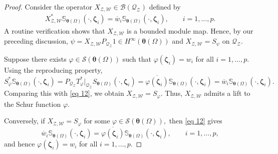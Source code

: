 \documentclass[10pt,a4paper]{amsart}
\newcommand{\beq}{\begin{eqnarray}}
\newcommand{\eeq}{\end{eqnarray}}
\begin{document}
\begin{proof}
    Consider the operator $X_{\mathcal{Z,W}}\in \mathcal{B}(\mathcal{Q}_{\mathcal{Z}})$ defined by \beq \label{eq 12} X_{\mathcal{Z,W}}^* \mathbb S_{\boldsymbol \theta(\Omega)}(\cdot, \boldsymbol \zeta_i)=\overline{w}_i \mathbb S_{\boldsymbol \theta(\Omega)}(\cdot, \boldsymbol \zeta_i),\qquad i=1,\ldots,p.\eeq 
    A routine verification shows that $X_{\mathcal{Z},\mathcal{W}}$ is a bounded module map. Hence, by our preceding discussion, $\psi=X_{\mathcal{Z,W}}P_{\mathcal{Q}_{\mathcal{Z}}}1\in H^\infty(\boldsymbol \theta(\Omega))$ and $X_{\mathcal{Z,W}}=S_{\psi}$ on $\mathcal{Q}_{\mathcal{Z}}.$

    Suppose there exists $\varphi\in \mathcal{S}(\boldsymbol \theta(\Omega))$ such that $\varphi(\boldsymbol{\zeta}_i) = w_i$ for all $i = 1, \ldots, p$. Using the reproducing property,
    $$S_{\varphi}^* \mathbb S_{\boldsymbol \theta(\Omega)}(\cdot, \boldsymbol \zeta_i)=P_{\mathcal{Q}_{\mathcal{Z}}} T_{\varphi}^*|_{\mathcal{Q}_{\mathcal{Z}}} S_{\boldsymbol \theta(\Omega)}(\cdot, \boldsymbol \zeta_i) = \overline{\varphi(\boldsymbol \zeta_i)}\mathbb S_{\boldsymbol \theta(\Omega)}(\cdot, \boldsymbol \zeta_i)=\overline{w}_i \mathbb S_{\boldsymbol \theta(\Omega)}(\cdot, \boldsymbol \zeta_i).$$ 
    Comparing this with \eqref{eq 12}, we obtain $X_{\mathcal{Z,W}}=S_{\varphi}.$ Thus, $X_{\mathcal{Z},\mathcal{W}}$ admits a lift to the Schur function $\varphi.$
    
    Conversely, if $X_{\mathcal{Z,W}}=S_{\varphi}$ for some $\varphi\in \mathcal{S}(\boldsymbol \theta(\Omega)),$ then \eqref{eq 12} gives
    $$\overline{w}_i \mathbb S_{\boldsymbol \theta(\Omega)}(\cdot, \boldsymbol \zeta_i)=\overline{\varphi(\boldsymbol \zeta_i)} \mathbb S_{\boldsymbol \theta(\Omega)}(\cdot,\boldsymbol \zeta_i), \qquad i=1,\ldots,p,$$ and hence  $\varphi(\boldsymbol \zeta_i)=w_i$ for all $i=1,\ldots,p.$


\end{proof}
\end{document}
